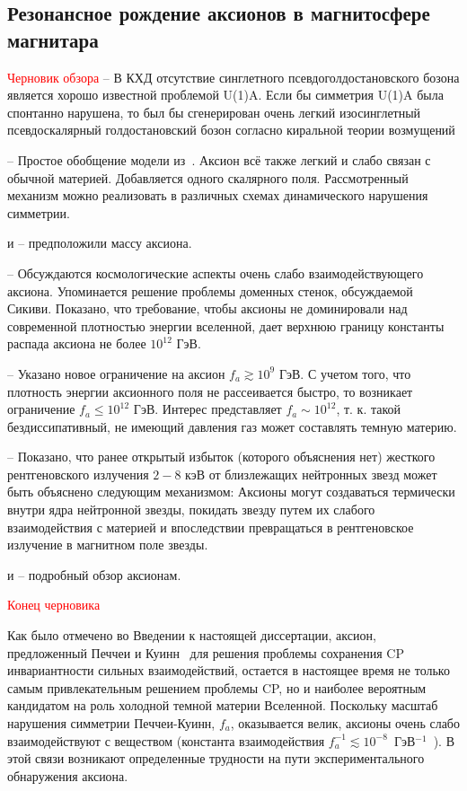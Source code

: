 \subsection{Резонансное рождение аксионов в магнитосфере магнитара}
\textcolor{red}{Черновик обзора}
\cite{Weinberg:1975} -- В КХД отсутствие синглетного псевдоголдостановского 
бозона является хорошо известной проблемой U(1)A. Если бы симметрия U(1)A была 
спонтанно нарушена, то был бы сгенерирован очень легкий изосинглетный 
псевдоскалярный голдостановский бозон согласно киральной теории возмущений

\cite{Dine:1981} -- Простое обобщение модели из~\cite{Quinn:1977}. Аксион всё также легкий и слабо связан с обычной материей. Добавляется одного скалярного поля. Рассмотренный механизм можно реализовать в различных схемах динамического нарушения симметрии.

\cite{Weinberg:1978} и \cite{Wilczek:1978} -- предположили массу аксиона.

\cite{Dine:1983} -- Обсуждаются космологические аспекты очень слабо взаимодействующего аксиона. Упоминается решение проблемы доменных стенок, обсуждаемой Сикиви. Показано, что требование, чтобы аксионы не доминировали над современной плотностью энергии вселенной, дает верхнюю границу константы распада аксиона не более $10^{12}$ ГэВ.

\cite{Preskill:1983} -- Указано новое ограничение на аксион $f_a\gtrsim 10^9$ ГэВ. С учетом того, что плотность энергии аксионного поля не рассеивается быстро, то возникает ограничение $f_a\leqslant10^{12}$ ГэВ. Интерес представляет $f_a\sim 10^{12}$, т. к. такой бездиссипативный, не имеющий давления газ может составлять темную материю.

\cite{Buschmann:2021} -- Показано, что ранее открытый избыток (которого объяснения нет) жесткого рентгеновского излучения $2-8$ кэВ от близлежащих нейтронных звезд может быть объяснено следующим механизмом: Аксионы могут создаваться термически внутри ядра нейтронной звезды, покидать звезду путем их слабого взаимодействия с материей и впоследствии превращаться в рентгеновское излучение в магнитном поле звезды.

\cite{Kim:2010} и \cite{Marsh:2016} -- подробный обзор аксионам.


\textcolor{red}{Конец черновика}

Как было отмечено во Введении к настоящей диссертации, аксион, предложенный Печчеи  и Куинн~\cite{Quinn:1977} для 
решения проблемы сохранения CP инвариантности 
сильных взаимодействий, остается в настоящее время не только самым привлекательным 
решением проблемы CP, но и наиболее вероятным кандидатом на роль холодной темной
материи Вселенной. Поскольку масштаб нарушения симметрии Печчеи-Куинн, $f_a$,
оказывается велик, аксионы очень слабо взаимодействуют с веществом
(константа взаимодействия $f_a^{-1} \lesssim 10^{-8}$\, ГэВ$^{-1}$~\cite{Raffelt:1996}). 
В этой связи возникают определенные трудности
на пути экспериментального обнаружения аксиона.


